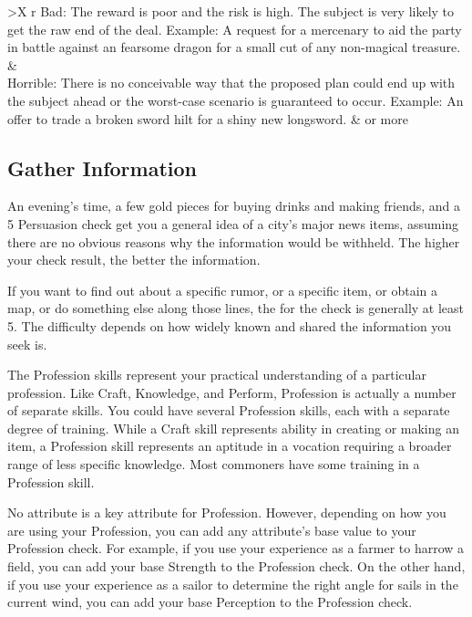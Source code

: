 \begin{dtable*}
\begin{dtabularx}{\textwidth}{>{\lcol}X r}
                Bad: The reward is poor and the risk is high. The subject is very likely to get the raw end of the deal. Example: A request for a mercenary to aid the party in battle against an fearsome dragon for a small cut of any non-magical treasure.                                                                    &                                                             \\
                Horrible: There is no conceivable way that the proposed plan could end up with the subject ahead or the worst-case scenario is guaranteed to occur. Example: An offer to trade a broken sword hilt for a shiny new longsword.                                                                                      &  or more                                                    \\
            \end{dtabularx}
        \end{dtable*}

    \subsection{Gather Information}
        An evening's time, a few gold pieces for buying drinks and making friends, and a  5 Persuasion check get you a general idea of a city's major news items, assuming there are no obvious reasons why the information would be withheld. The higher your check result, the better the information.

        If you want to find out about a specific rumor, or a specific item, or obtain a map, or do something else along those lines, the  for the check is generally at least 5.
        The difficulty depends on how widely known and shared the information you seek is.

\newpage
{}
    The Profession skills represent your practical understanding of a particular profession.
        Like Craft, Knowledge, and Perform, Profession is actually a number of separate skills.
        You could have several Profession skills, each with a separate degree of training.
        While a Craft skill represents ability in creating or making an item, a Profession skill represents an aptitude in a vocation requiring a broader range of less specific knowledge.
        Most commoners have some training in a Profession skill.

        No attribute is a key attribute for Profession.
        However, depending on how you are using your Profession, you can add any attribute's base value to your Profession check.
        For example, if you use your experience as a farmer to harrow a field, you can add your base Strength to the Profession check.
        On the other hand, if you use your experience as a sailor to determine the right angle for sails in the current wind, you can add your base Perception to the Profession check.

